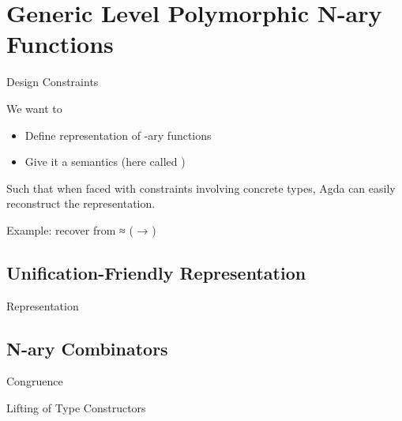 \documentclass[compress,9pt]{beamer}
\begin{document}
\section{Generic Level Polymorphic N-ary Functions}

\begin{frame}{Design Constraints}

  We want to
  \begin{itemize}
    \item Define representation of -ary functions
    \item Give it a semantics (here called )
  \end{itemize}

  \bigskip
  Such that when faced with constraints involving concrete types,
  Agda can easily reconstruct the representation.

  \bigskip
  Example: recover  from {   ≈ ( → )}
\end{frame}

\subsection{Unification-Friendly Representation}

\begin{frame}{Representation}
  \begin{minipage}{0.5\textwidth}
  \end{minipage}\begin{minipage}{0.4\textwidth}
  \end{minipage}
\end{frame}

\subsection{N-ary Combinators}

\begin{frame}{Congruence}
\end{frame}

\begin{frame}{Lifting of Type Constructors}
\end{frame}
\end{document}
